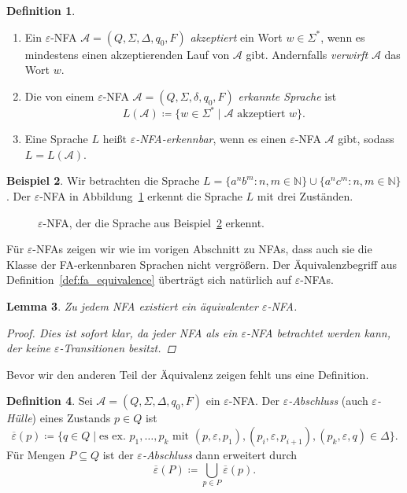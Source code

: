 \documentclass[11pt, a4paper]{article}
\theoremstyle{definition}
\newtheorem{definition}{Definition}[section]
\newtheorem{example}[definition]{Beispiel}
\theoremstyle{plain}
\newtheorem{lemma}[definition]{Lemma}
\numberwithin{equation}{section}
\newcommand{\comp}[1]{\overline{#1}}
\begin{document}
\begin{definition}
\
	\begin{enumerate}
		\item Ein $\varepsilon$-NFA $\mathcal{A} = (Q, \Sigma, \Delta, q_0, F)$ \textit{akzeptiert} ein Wort $w \in \Sigma^\ast$, wenn es mindestens einen akzeptierenden Lauf von $\mathcal{A}$ gibt. Andernfalls \textit{verwirft} $\mathcal{A}$ das Wort $w$.
		\item Die von einem $\varepsilon$-NFA $\mathcal{A} = (Q, \Sigma, \delta, q_0, F)$ \textit{erkannte Sprache} ist
			$$
				L(\mathcal{A}) \coloneqq \{ w \in \Sigma^\ast \mid \mathcal{A} \text{ akzeptiert } w \}.
			$$
		\item Eine Sprache $L$ heißt \textit{$\varepsilon$-NFA-erkennbar}, wenn es einen $\varepsilon$-NFA $\mathcal{A}$ gibt, sodass $L = L(\mathcal{A})$.
	\end{enumerate}
\end{definition}
\begin{example}\label{exp:ex3}
	Wir betrachten die Sprache $L = \{ a^n b^m : n, m \in \mathbb{N} \} \cup \{ a^n c^m : n, m \in \mathbb{N} \}$. Der $\varepsilon$-NFA in Abbildung~\ref{fig:epsnfa_ex1} erkennt die Sprache $L$ mit drei Zuständen.
\end{example}
\begin{figure}
	\centering
	
	\caption{$\varepsilon$-NFA, der die Sprache aus Beispiel~\ref{exp:ex3} erkennt.}
	\label{fig:epsnfa_ex1}
\end{figure}
Für $\varepsilon$-NFAs zeigen wir wie im vorigen Abschnitt zu NFAs, dass auch sie die Klasse der FA-erkennbaren Sprachen nicht vergrößern. Der Äquivalenzbegriff aus Definition~\ref{def:fa_equivalence} überträgt sich natürlich auf $\varepsilon$-NFAs.
\begin{lemma}
	Zu jedem NFA existiert ein äquivalenter $\varepsilon$-NFA.
	\begin{proof}
		Dies ist sofort klar, da jeder NFA als ein $\varepsilon$-NFA betrachtet werden kann, der keine $\varepsilon$-Transitionen besitzt.
	\end{proof}
\end{lemma}
Bevor wir den anderen Teil der Äquivalenz zeigen fehlt uns eine Definition.
\begin{definition}\label{def:eps_closure}
	Sei $\mathcal{A} = (Q, \Sigma, \Delta, q_0, F)$ ein $\varepsilon$-NFA. Der \textit{$\varepsilon$-Abschluss} (auch \textit{$\varepsilon$-Hülle}) eines Zustands $p \in Q$ ist
	$$
		\comp{\varepsilon}(p) \coloneqq \{ q \in Q \mid \text{es ex. } p_1, \ldots, p_k \text{ mit } (p, \varepsilon, p_1), (p_i, \varepsilon, p_{i+1}), (p_k, \varepsilon, q) \in \Delta \}.
	$$
	Für Mengen $P \subseteq Q$ ist der \textit{$\varepsilon$-Abschluss} dann erweitert durch
	$$
		\comp{\varepsilon}(P) \coloneqq \bigcup_{p \in P} \comp{\varepsilon}(p).
	$$
\end{definition}
\end{document}
